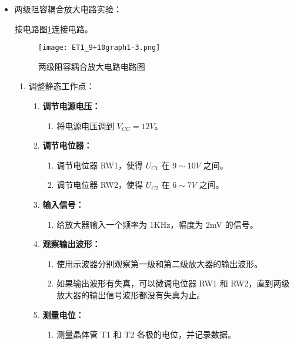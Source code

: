 \documentclass[dvipsnames, svgnames,a4paper,11pt]{article}
\begin{document}
		\begin{itemize}
			\item 两级阻容耦合放大电路实验：
			
				按电路图\cref{fig:fig1-3t}连接电路。

				\begin{figure}[htbp]
					\centering
					\texttt{[image: ET1\_9+10graph1-3.png]}
					\caption{两级阻容耦合放大电路电路图}
					\label{fig:fig1-3t}
				\end{figure}


				\begin{enumerate}
					\item 调整静态工作点：
						\begin{enumerate}
							\item \textbf{调节电源电压：}
							\begin{enumerate}
								\item 将电源电压调到 $V_{CC} = 12V$。
							\end{enumerate}
						
							\item \textbf{调节电位器：}
							\begin{enumerate}
								\item 调节电位器 RW1，使得 $U_{C1}$ 在 $9 \sim 10V$ 之间。
								\item 调节电位器 RW2，使得 $U_{C2}$ 在 $6 \sim 7V$ 之间。
							\end{enumerate}
						
							\item \textbf{输入信号：}
							\begin{enumerate}
								\item 给放大器输入一个频率为 1KHz，幅度为 2mV 的信号。
							\end{enumerate}
						
							\item \textbf{观察输出波形：}
							\begin{enumerate}
								\item 使用示波器分别观察第一级和第二级放大器的输出波形。
								\item 如果输出波形有失真，可以微调电位器 RW1 和 RW2，直到两级放大器的输出信号波形都没有失真为止。
							\end{enumerate}
						
							\item \textbf{测量电位：}
							\begin{enumerate}
								\item 测量晶体管 T1 和 T2 各极的电位，并记录数据。
							\end{enumerate}
						\end{enumerate}


\end{enumerate}
\end{itemize}
\end{document}
